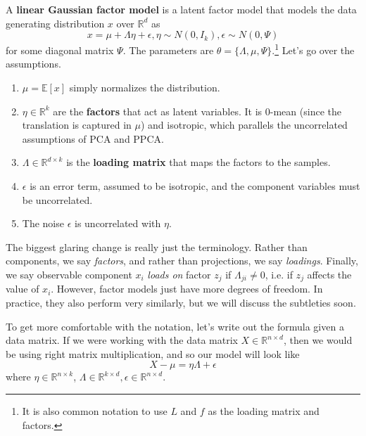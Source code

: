   \begin{definition} 
    A \textbf{linear Gaussian factor model} is a latent factor model that models the data generating distribution $x$ over $\mathbb{R}^d$ as 
    \begin{equation}
      x = \mu + \Lambda \eta + \epsilon, \eta \sim N(0, I_k), \epsilon \sim N(0, \Psi)
    \end{equation}
    for some diagonal matrix $\Psi$. The parameters are $\theta = \{\Lambda, \mu, \Psi\}$.\footnote{It is also common notation to use $L$ and $f$ as the loading matrix and factors.} Let's go over the assumptions. 
    \begin{enumerate}
      \item $\mu = \mathbb{E}[x]$ simply normalizes the distribution. 
      \item $\eta \in \mathbb{R}^k$ are the \textbf{factors} that act as latent variables. It is $0$-mean (since the translation is captured in $\mu$) and isotropic, which parallels the uncorrelated assumptions of PCA and PPCA. 
      \item $\Lambda \in \mathbb{R}^{d \times k}$ is the \textbf{loading matrix} that maps the factors to the samples. 
      \item $\epsilon$ is an error term, assumed to be isotropic, and the component variables must be uncorrelated. 
      \item The noise $\epsilon$ is uncorrelated with $\eta$. 
    \end{enumerate}
  \end{definition} 

  The biggest glaring change is really just the terminology. Rather than components, we say \textit{factors}, and rather than projections, we say \textit{loadings}. Finally, we say observable component $x_i$ \textit{loads on} factor $z_j$ if $\Lambda_{ji} \neq 0$, i.e. if $z_j$ affects the value of $x_i$. However, factor models just have more degrees of freedom. In practice, they also perform very similarly, but we will discuss the subtleties soon. 

  To get more comfortable with the notation, let's write out the formula given a data matrix. If we were working with the data matrix $X \in \mathbb{R}^{n \times d}$, then we would be using right matrix multiplication, and so our model will look like 
  \begin{equation}
    X - \mu = \eta \Lambda + \epsilon
  \end{equation}
  where $\eta \in \mathbb{R}^{n \times k}$, $\Lambda \in \mathbb{R}^{k \times d}, \epsilon \in \mathbb{R}^{n \times d}$. 

